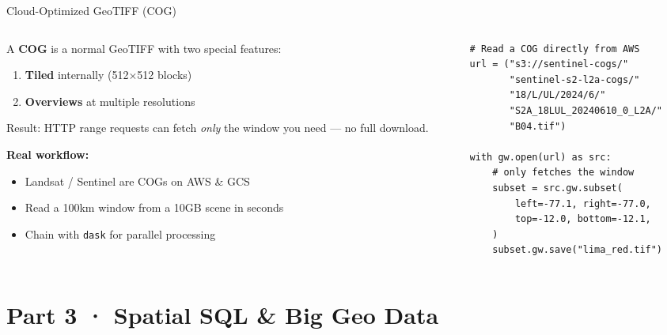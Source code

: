 \documentclass[10pt,aspectratio=169]{beamer}
\begin{document}
\begin{frame}[fragile]{Cloud-Optimized GeoTIFF (COG)}
  \begin{columns}[T]
    \begin{column}{0.55\textwidth}
      A \textbf{COG} is a normal GeoTIFF with two special features:
      \begin{enumerate}\itemsep3pt
        \item \textbf{Tiled} internally (512$\times$512 blocks)
        \item \textbf{Overviews} at multiple resolutions
      \end{enumerate}
      \vspace{0.4em}
      Result: HTTP range requests can fetch \textit{only} the window you need — no full download.
      \vspace{0.6em}

      \textbf{Real workflow:}
      \begin{itemize}\itemsep2pt
        \item Landsat / Sentinel are COGs on AWS \& GCS
        \item Read a 100km window from a 10GB scene in seconds
        \item Chain with \texttt{dask} for parallel processing
      \end{itemize}
    \end{column}
    \begin{column}{0.42\textwidth}
\begin{lstlisting}[style=py]
# Read a COG directly from AWS
url = ("s3://sentinel-cogs/"
       "sentinel-s2-l2a-cogs/"
       "18/L/UL/2024/6/"
       "S2A_18LUL_20240610_0_L2A/"
       "B04.tif")

with gw.open(url) as src:
    # only fetches the window
    subset = src.gw.subset(
        left=-77.1, right=-77.0,
        top=-12.0, bottom=-12.1,
    )
    subset.gw.save("lima_red.tif")
\end{lstlisting}
    \end{column}
  \end{columns}
\end{frame}

\section{Part 3 · Spatial SQL \& Big Geo Data}
\end{document}
